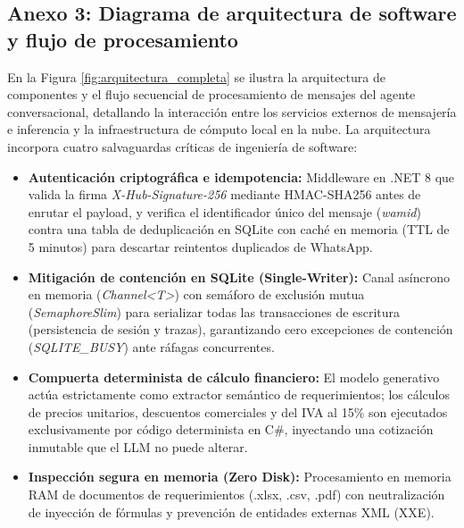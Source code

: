\subsection{Anexo 3: Diagrama de arquitectura de software y flujo de procesamiento}

En la Figura \ref{fig:arquitectura_completa} se ilustra la arquitectura de componentes y el flujo secuencial de procesamiento de mensajes del agente conversacional, detallando la interacción entre los servicios externos de mensajería e inferencia y la infraestructura de cómputo local en la nube. La arquitectura incorpora cuatro salvaguardas críticas de ingeniería de software:
\begin{itemize}
    \item \textbf{Autenticación criptográfica e idempotencia:} Middleware en .NET 8 que valida la firma \textit{X-Hub-Signature-256} mediante HMAC-SHA256 antes de enrutar el payload, y verifica el identificador único del mensaje (\textit{wamid}) contra una tabla de deduplicación en SQLite con caché en memoria (TTL de 5 minutos) para descartar reintentos duplicados de WhatsApp.
    \item \textbf{Mitigación de contención en SQLite (Single-Writer):} Canal asíncrono en memoria (\textit{Channel<T>}) con semáforo de exclusión mutua (\textit{SemaphoreSlim}) para serializar todas las transacciones de escritura (persistencia de sesión y trazas), garantizando cero excepciones de contención (\textit{SQLITE\_BUSY}) ante ráfagas concurrentes.
    \item \textbf{Compuerta determinista de cálculo financiero:} El modelo generativo actúa estrictamente como extractor semántico de requerimientos; los cálculos de precios unitarios, descuentos comerciales y del IVA al 15\% son ejecutados exclusivamente por código determinista en C\#, inyectando una cotización inmutable que el LLM no puede alterar.
    \item \textbf{Inspección segura en memoria (Zero Disk):} Procesamiento en memoria RAM de documentos de requerimientos (.xlsx, .csv, .pdf) con neutralización de inyección de fórmulas y prevención de entidades externas XML (XXE).
\end{itemize}

